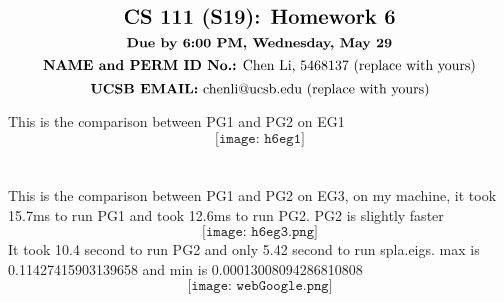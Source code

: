 \documentclass[11pt]{article}
\begin{document}
$$\mbox{\Large \textbf {CS 111 (S19): Homework 6}}$$
$$\mbox{\textbf {Due by 6:00 PM, Wednesday, May 29}}$$
$$\mbox{\textbf {NAME and PERM ID No.:} Chen Li, 5468137 (replace with yours)}$$
$$\mbox{\textbf {UCSB EMAIL:} chenli@ucsb.edu (replace with yours)}$$


This is the comparison between PG1 and PG2 on EG1\\
$$\texttt{[image: h6eg1]}$$\\
\\This is the comparison between PG1 and PG2 on EG3, on my machine, it took 15.7ms  to run PG1 and took 12.6ms to run PG2. PG2 is slightly faster \\
$$\texttt{[image: h6eg3.png]}$$
\newpage
It took 10.4 second to run PG2 and only 5.42 second to run spla.eigs. max is 0.11427415903139658 and min is 0.00013008094286810808
$$\texttt{[image: webGoogle.png]}$$
\end{document}
